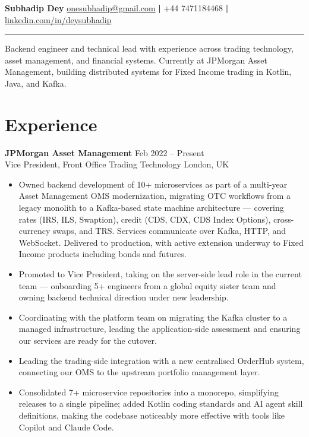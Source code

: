 \documentclass[a4paper,9pt]{article}
\begin{document}
\noindent
{\color{navy}\textbf{\LARGE Subhadip Dey}} \hfill \href{mailto:onesubhadip@gmail.com}{onesubhadip@gmail.com} \textbf{|} +44 7471184468 \textbf{|} \href{https://www.linkedin.com/in/deysubhadip/}{linkedin.com/in/deysubhadip}
\\[-4pt]
{\color{navy}\rule{\linewidth}{1.2pt}}
\vspace{2pt}

Backend engineer and technical lead with experience across trading technology, asset management, and financial systems. Currently at JPMorgan Asset Management, building distributed systems for Fixed Income trading in Kotlin, Java, and Kafka.
\vspace{2pt}

\section*{Experience}

\textbf{JPMorgan Asset Management} \hfill Feb 2022 -- Present \\
{\color{navy}Vice President, Front Office Trading Technology} \hfill London, UK \vspace{-5pt}\\

\begin{itemize}[left=0pt, label=\textbullet, itemsep=0pt, parsep=0pt, topsep=0pt, partopsep=0pt]
    \item Owned backend development of 10+ microservices as part of a multi-year Asset Management OMS modernization, migrating OTC workflows from a legacy monolith to a Kafka-based state machine architecture --- covering rates (IRS, ILS, Swaption), credit (CDS, CDX, CDS Index Options), cross-currency swaps, and TRS. Services communicate over Kafka, HTTP, and WebSocket. Delivered to production, with active extension underway to Fixed Income products including bonds and futures.
    \item Promoted to Vice President, taking on the server-side lead role in the current team --- onboarding 5+ engineers from a global equity sister team and owning backend technical direction under new leadership.
    \item Coordinating with the platform team on migrating the Kafka cluster to a managed infrastructure, leading the application-side assessment and ensuring our services are ready for the cutover.
    \item Leading the trading-side integration with a new centralised OrderHub system, connecting our OMS to the upstream portfolio management layer.
    \item Consolidated 7+ microservice repositories into a monorepo, simplifying releases to a single pipeline; added Kotlin coding standards and AI agent skill definitions, making the codebase noticeably more effective with tools like Copilot and Claude Code.
\end{itemize}
\vspace{2pt}
\end{document}

